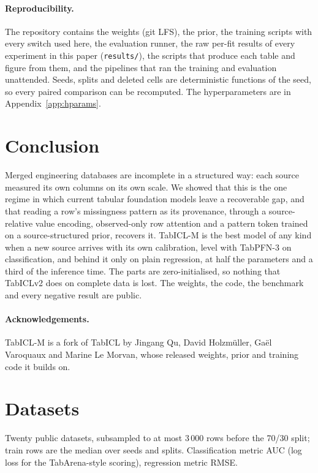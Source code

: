 \documentclass[11pt]{article}
\begin{document}
\paragraph{Reproducibility.} The repository contains the weights (git LFS), the prior, the
training scripts with every switch used here, the evaluation runner, the raw per-fit
results of every experiment in this paper (\texttt{results/}), the scripts that produce
each table and figure from them, and the pipelines that ran the training and evaluation
unattended. Seeds, splits and deleted cells are deterministic functions of the seed, so
every paired comparison can be recomputed. The hyperparameters are in
Appendix~\ref{app:hparams}.

\section{Conclusion}

Merged engineering databases are incomplete in a structured way: each source measured
its own columns on its own scale. We showed that this is the one regime in which current
tabular foundation models leave a recoverable gap, and that reading a row's missingness
pattern as its provenance, through a source-relative value encoding, observed-only row
attention and a pattern token trained on a source-structured prior, recovers it.
TabICL-M is the best model of any kind when a new source arrives with its own
calibration, level with TabPFN-3 on classification, and behind it only on plain
regression, at half the parameters and a third of the inference time. The parts are
zero-initialised, so nothing that TabICLv2 does on complete data is lost. The weights,
the code, the benchmark and every negative result are public.

\paragraph{Acknowledgements.} TabICL-M is a fork of TabICL by Jingang Qu, David
Holzm\"uller, Ga\"el Varoquaux and Marine Le Morvan, whose released weights, prior and
training code it builds on.

\appendix

\section{Datasets}
\label{app:data}

Twenty public datasets, subsampled to at most 3\,000 rows before the 70/30 split; train
rows are the median over seeds and splits. Classification metric AUC (log loss for the
TabArena-style scoring), regression metric RMSE.
\end{document}
